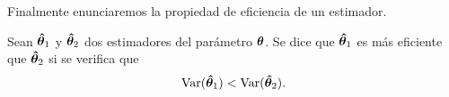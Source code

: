 \documentclass[oneside,openright,titlepage,numbers=noenddot,openany,headinclude,footinclude=true,
cleardoublepage=empty,abstractoff,BCOR=5mm,paper=a4,fontsize=12pt,main=spanish]{scrreprt}
\begin{document}

Finalmente enunciaremos la propiedad de eficiencia de un estimador.\\

\begin{definition}[Eficiencia] \label{def:efvar}
Sean $\bm{\hat{\theta}}_1$ y $\bm{\hat{\theta}}_2$ dos estimadores del parámetro $\bm{\theta}$. Se dice que $\bm{\hat{\theta}}_1$ es más eficiente que $\bm{\hat{\theta}}_2$ si se verifica que $$\text{Var}(\bm{\hat{\theta}}_1)<\text{Var}(\bm{\hat{\theta}}_2).$$
\end{definition}\

\end{document}
